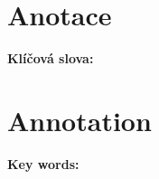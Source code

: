 ﻿\section*{Anotace}\label{abstract}



\vspace{1cm}

\noindent\textbf{\bf Klíčová slova\?:} 

\vfill


\section*{Annotation}



\vspace{1cm}

\noindent\textbf{Key words\?:} 

\vglue 1cm
